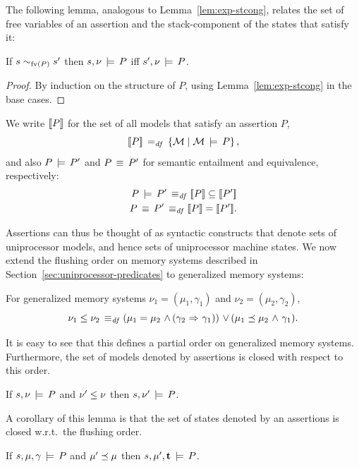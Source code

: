 \documentclass[11pt]{report}
\begin{document}
The following lemma, analogous to Lemma~\ref{lem:exp-stcong}, relates the set of free variables of an assertion and the stack-component of the states that satisfy it:
\begin{lemma}
\label{lem:assertion-stcong}
    If $s \sim_{\mathrm{fv}(P)} s'$ then $s,\nu \,\models\, P$ iff $s',\nu \,\models\, P$. 
\end{lemma}
\begin{proof}
By induction on the structure of $P$, using Lemma~\ref{lem:exp-stcong} in the base cases. 
\end{proof}

We write $[\![P]\!]$ for the set of all models that satisfy an assertion $P$,\[ [\![P]\!] \operatorname{\;=_{\mathit{df}}\;} \left\lbrace \mathcal{M} \mid \mathcal{M} \,\models\, P \right\rbrace,\] and also $P \,\models\, P'$ and $P \,\equiv\, P'$ for semantic entailment and equivalence, respectively: \begin{align*}
    P \sentails P' \iffdef \pred{P} \subseteq \pred{P'} \\
    P \sequiv P' \iffdef \pred{P} = \pred{P'}.
\end{align*} 

Assertions can thus be thought of as syntactic constructs that denote sets of uniprocessor models, and hence sets of uniprocessor machine states. We now extend the flushing order on memory systems described in Section~\ref{sec:uniprocessor-predicates} to generalized memory systems: 
\begin{definition}
  For generalized memory systems $\nu_1 = (\mu_1,\gamma_1)$ and $\nu_2 = (\mu_2,\gamma_2)$, \[ \nu_1 \leq \nu_2 \operatorname{\;\equiv_{\mathit{df}}\;} (\mu_1 = \mu_2 \operatorname{\,\wedge\,} (\gamma_2 \operatorname{\,\Rightarrow\,} \gamma_1)) \operatorname{\,\vee\,} (\mu_1 \preceq \mu_2 \operatorname{\,\wedge\,} \gamma_1).\]
\end{definition} It is easy to see that this defines a partial order on generalized memory systems. Furthermore, the set of models denoted by assertions is closed with respect to this order. 

\begin{lemma}
    \label{lem:assertions-denote-predicates}
    If $s,\nu \,\models\, P$ and $\nu' \leq \nu$ then $s,\nu' \,\models\, P$. 
\end{lemma}

A corollary of this lemma is that the set of states denoted by an assertions is closed w.r.t.\ the flushing order.  

\begin{corollary}
  If $s,\mu,\gamma \,\models\, P$ and $\mu' \preceq \mu$ then $s,\mu',\mathbf{t} \,\models\, P$. 
\end{corollary}
\end{document}
